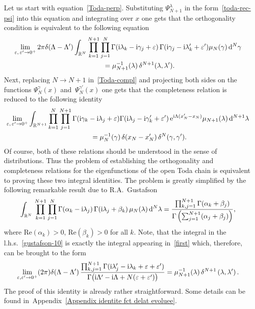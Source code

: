 \documentclass[pdftex]{sigma}%
\numberwithin{equation}{section}
\begin{document}
Let us start with equation~\eqref{Toda-perp}. Substituting $\Psi_{N+1}^\lambda$ in the form~\eqref{toda-rec-psi} into this equation and
integrating over $x$ one gets that the orthogonality condition is equivalent to the following equation
\begin{gather}
\lim_{\varepsilon,\,\varepsilon' \rightarrow 0^+}2\pi \delta(\Lambda-\Lambda')\int_{\mathbb{R}^{N}}
\prod_{k=1}^{N+1}\prod_{j=1}^{N} \Gamma({\rm i} \lambda_k-{\rm i}\gamma_j+\varepsilon)\, \Gamma({\rm i}\gamma_j-{\rm i}\lambda'_k+\varepsilon')
\mu_N(\gamma)\, {\rm d}^N\gamma \nonumber
\\ \hphantom{\lim_{\varepsilon,\,\varepsilon' \rightarrow 0^+}}
{}= \mu^{-1}_{N+1}(\lambda)\, \delta^{N+1}(\lambda, \lambda').\label{first}
\end{gather}
Next, replacing $N\to N+1$ in~\eqref{Toda-compl} and projecting both sides on
the functions $\Psi^\gamma_N(x)$ and~$\Psi^{\gamma'}_N(x)$ one gets that the completeness relation is reduced to the following identity
\begin{gather}
\lim_{\varepsilon,\,\varepsilon' \rightarrow 0^+} \int_{\mathbb R^{N+1}}
\prod_{k=1}^{N}\prod_{j=1}^{N+1} \Gamma({\rm i} \gamma_k-{\rm i}\lambda_j+\varepsilon)
\Gamma({\rm i}\lambda_j-{\rm i}\gamma'_k+\varepsilon')\,
{\rm e}^{{\rm i}\Lambda(x'_N-x_N)}\mu_{N+1}(\lambda)\, {\rm d}^{N+1}\lambda\nonumber
\\ \hphantom{\lim_{\varepsilon,\,\varepsilon' \rightarrow 0^+}}
{}= \mu^{-1}_{N}(\gamma)\,\delta(x_N-x'_N)\,\delta^{N}(\gamma, \gamma').\label{second}
\end{gather}
Of course, both of these relations should be understood in the sense of distributions. Thus the problem of establishing the orthogonality
and completeness relations for the eigenfunctions of the open Toda chain is equivalent to proving these two integral identities. The
problem is greatly simplified by the following remarkable result due to R.A.~Gustafson~\cite[Theorem~5.1]{MR1139492}
%
\begin{align}\label{gustafson-10}
%
\int_{\mathbb R^N}\,
\prod_{k=1}^{N+1}\prod_{j=1}^N \Gamma( \alpha_k-{\rm i}\lambda_j)\,\Gamma({\rm i}\lambda_j+\beta_k)\,
\mu_N(\lambda)\, {\rm d}^N\lambda
=\frac{\prod_{k,j=1}^{N+1}\Gamma(\alpha_k+\beta_j)}
{\Gamma\left(\sum_{j=1}^{N+1}(\alpha_j+\beta_j)\right)},
%
\end{align}
%
where $\text{Re}(\alpha_k)>0$, $\text{Re}(\beta_k)>0$ for all $k$. Note, that the integral in the l.h.s.~\eqref{gustafson-10} is exactly
the integral appearing in~\eqref{first} which, therefore, can be brought to the form
%
\begin{align}\label{first-reduced}
\lim_{\varepsilon,\varepsilon' \rightarrow 0^+} (2\pi) \delta(\Lambda-\Lambda')\,
\frac{\prod_{k,j=1}^{N+1}\Gamma({\rm i}\lambda'_j-{\rm i}\lambda_k+\varepsilon+\varepsilon')}
{\Gamma\big({\rm i}\Lambda'-{\rm i}\Lambda+N(\varepsilon+\varepsilon')\big)} = {\mu_{N+1}^{-1}(\lambda)}\,
\delta^{N+1}\left(\lambda,\lambda'\right).
\end{align}
The proof of this identity is already rather straightforward. Some details can be found in~Appen\-dix~\ref{Appendix identite fct delat
evoluee}.
\end{document}
